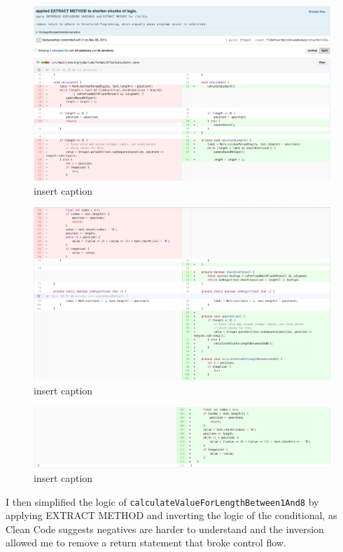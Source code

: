 \begin{figure}[H]
	\centering
	\includegraphics[width=\linewidth]{code30}
	\caption{insert caption}
\end{figure}
\begin{figure}[H]
	\centering
	\includegraphics[width=\linewidth]{code31}
	\caption{insert caption}
\end{figure}
\begin{figure}[H]
	\centering
	\includegraphics[width=\linewidth]{code32}
	\caption{insert caption}
\end{figure}

I then simplified the logic of \texttt{calculateValueForLengthBetween1And8} by applying EXTRACT METHOD and inverting the logic of the conditional, as Clean Code suggests negatives are harder to understand and the inversion allowed me to remove a return statement that broke control flow.


